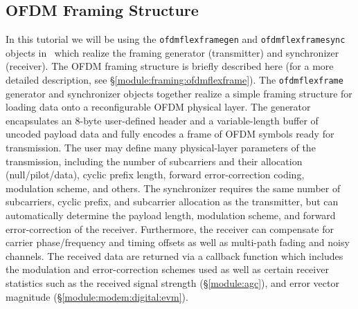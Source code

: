 %
%
\subsection{OFDM Framing Structure}
\label{tutorial:ofdmflexframe:structure}
%
In this tutorial we will be using the {\tt ofdmflexframegen} and
{\tt ofdmflexframesync} objects in \liquid\ which realize the
framing generator (transmitter) and synchronizer (receiver).
The OFDM framing structure is briefly described here
(for a more detailed description, see
\S\ref{module:framing:ofdmflexframe}).
The {\tt ofdmflexframe} generator and synchronizer objects
together realize a simple framing structure
for loading data onto a reconfigurable OFDM physical layer.
The generator encapsulates an 8-byte user-defined header
and a variable-length buffer of uncoded payload data
and fully encodes a frame of OFDM symbols ready for transmission.
The user may define many physical-layer parameters of the transmission,
including
  the number of subcarriers and their allocation (null/pilot/data),
  cyclic prefix length,
  forward error-correction coding,
  modulation scheme,
  and others.
The synchronizer requires the same number of subcarriers, cyclic prefix,
and subcarrier allocation as the transmitter, but can automatically
determine the payload length, modulation scheme, and forward
error-correction of the receiver.
Furthermore, the receiver can compensate for carrier phase/frequency and
timing offsets as well as multi-path fading and noisy channels.
The received data are returned via a callback function which includes
the modulation and error-correction schemes used
as well as certain receiver statistics such as the
received signal strength (\S\ref{module:agc}),
and error vector magnitude (\S\ref{module:modem:digital:evm}).



%
%
